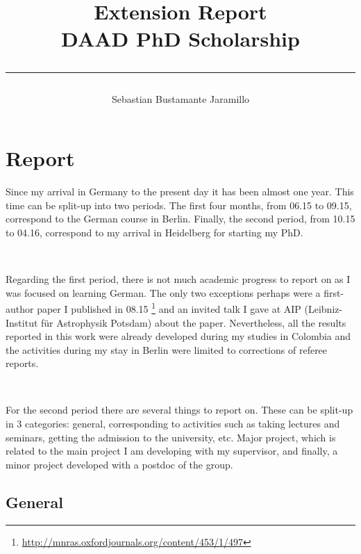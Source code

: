 \documentclass[a4,useAMS,usenatbib,usegraphicx,12pt]{article}
\title{{\textbf{Extension Report}}\\ 
				DAAD PhD Scholarship\\ 
				\color{black}\rule{15cm}{0.5mm}}
\author{Sebastian Bustamante Jaramillo}
\date{}
\begin{document}
\maketitle

\tableofcontents
 
\newpage 

\section{Report}

Since my arrival in Germany to the present day it has been almost one year. This
time can be split-up into two periods. The first four months, from 06.15 to 09.15,
correspond to the German course in Berlin. Finally, the second period, from 10.15 
to 04.16, correspond to my arrival in Heidelberg for starting my PhD.

\

Regarding the first period, there is not much academic progress to report on as 
I was focused on learning German. The only two exceptions perhaps were a 
first-author paper I pu\-blished in 08.15 \citep{Bustamante15}
\footnote{\url{http://mnras.oxfordjournals.org/content/453/1/497}} and an invited
talk I gave at AIP (Leibniz-Institut f\"ur Astrophysik Potsdam) about the paper. 
Nevertheless, all the results reported in this work were already developed during 
my studies in Colombia and the activities during my stay in Berlin were limited 
to corrections of referee reports.

\

For the second period there are several things to report on. These can be split-up 
in 3 categories: general, corresponding to activities such as taking lectures 
and seminars, getting the admission to the university, etc. Major project, which 
is related to the main project I am developing with my supervisor, and finally, 
a minor project developed with a postdoc of the group.


\subsection{General}
\end{document}

